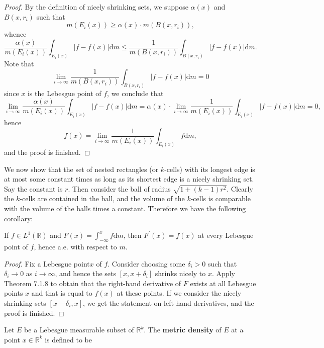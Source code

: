 \begin{proof}
By the definition of nicely shrinking sets, we suppose $\alpha(x)$ and $B(x,r_i)$ such that 
$$m(E_i(x))\ge\alpha(x)\cdot m(B(x,r_i)),$$
whence 
$$
\frac{\alpha \left( x \right)}{m\left( E_i\left( x \right) \right)}\int_{E_i\left( x \right)}{\left| f-f\left( x \right) \right|\mathrm{d}m}\le \frac{1}{m\left( B\left( x,r_i \right) \right)}\int_{B\left( x,r_i \right)}{\left| f-f\left( x \right) \right|\mathrm{d}m}.
$$
Note that 
$$
\lim_{i\rightarrow \infty} \frac{1}{m\left( B\left( x,r_i \right) \right)}\int_{B\left( x,r_i \right)}{\left| f-f\left( x \right) \right|\mathrm{d}m}=0
$$
since $x$ is the Lebesgue point of $f$, we conclude that 
$$
\lim_{i\rightarrow \infty} \frac{\alpha \left( x \right)}{m\left( E_i\left( x \right) \right)}\int_{E_i\left( x \right)}{\left| f-f\left( x \right) \right|\mathrm{d}m}=\alpha \left( x \right) \cdot \lim_{i\rightarrow \infty} \frac{1}{m\left( E_i\left( x \right) \right)}\int_{E_i\left( x \right)}{\left| f-f\left( x \right) \right|\mathrm{d}m}=0,
$$
hence 
$$
f\left( x \right) =\lim_{i\rightarrow \infty} \frac{1}{m\left( E_i\left( x \right) \right)}\int_{E_i\left( x \right)}{f\mathrm{d}m},
$$
and the proof is finished.
\end{proof}
We now show that the set of nested rectangles (or $k$-cells) with its longest edge is at most some constant times as long as its shortest edge is a nicely shrinking set. Say the constant is $r$. Then consider the ball of radius $\sqrt{1+(k-1)r^2}$. Clearly the $k$-cells are contained in the ball, and the volume of the $k$-cells is comparable with the volume of the balls times a constant. Therefore we have the following corollary:
\begin{corollary}
If $f\in L^1(\mathbb{R})$ and $F(x)=\int_{-\infty}^xf\mathrm{d}m$, then $F^\prime(x)=f(x)$ at every Lebesgue point of $f$, hence a.e. with respect to $m$.
\end{corollary}
\begin{proof}
Fix a Lebesgue point$x$ of $f$. Consider choosing some $\delta_i>0$ such that $\delta_i\to 0$ as $i\to\infty$, and hence the sets $[x,x+\delta_i]$ shrinks nicely to $x$. Apply Theorem 7.1.8 to obtain that the right-hand derivative of $F$ exists at all Lebesgue points $x$ and that is equal to $f(x)$ at these points. If we consider the nicely shrinking sets $[x-\delta_i,x]$, we get the statement on left-hand derivatives, and the proof is finished.
\end{proof}
Let $E$ be a Lebesgue measurable subset of $\mathbb{R}^k$. The \textbf{metric density} of $E$ at a point $x\in\mathbb{R}^k$ is defined to be 
